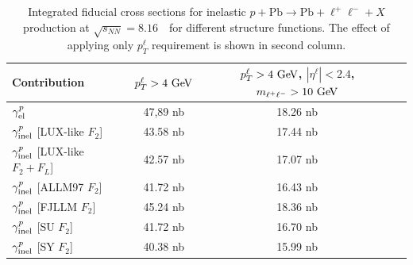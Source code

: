 \begin{table}[t]
\centering
\begin{tabular}{|l|c|c|c|}
\hline
Contribution  &  $p_{T}^{\ell}>4~\text{Ge\kern -0.1em V}$ & $p_{T}^{\ell}>4~\text{Ge\kern -0.1em V}$, $|\eta^{\ell}|<2.4 $, $m_{\ell^+\ell^-}>10~\text{Ge\kern -0.1em V}$ \\
\hline
$\gamma^{p}_{\rm{el}}$   & 47,89 nb  & 18.26 nb \\
\hline
$\gamma^{p}_{\rm{inel}}$ [LUX-like  $F_2$]  & 43.58 nb  &  17.44 nb\\
\hline
$\gamma^{p}_{\rm{inel}}$ [LUX-like  $F_2+F_L$]  & 42.57 nb    & 17.07 nb\\
\hline    
$\gamma^{p}_{\rm{inel}}$ [ALLM97 $F_2$]  & 41.72 nb   &16.43 nb\\
\hline
$\gamma^{p}_{\rm{inel}}$ [FJLLM $F_2$]  & 45.24 nb  &18.36 nb\\
\hline
$\gamma^{p}_{\rm{inel}}$ [SU $F_2$]  & 41.72  nb &16.70 nb\\
\hline 
$\gamma^{p}_{\rm{inel}}$ [SY $F_2$]  & 40.38  nb  &15.99 nb\\
\hline
\end{tabular}
\caption{Integrated fiducial cross sections for inelastic $p+\textrm{Pb}\rightarrow \textrm{Pb} + \ell^+\ell^- + X$ production at $\sqrt{s_{N N}} = 8.16$~\TeV\ for different structure functions. 
The effect of applying only $p_T^{\ell}$ requirement is shown in second column.
}
\label{tab:kt}
\end{table}



